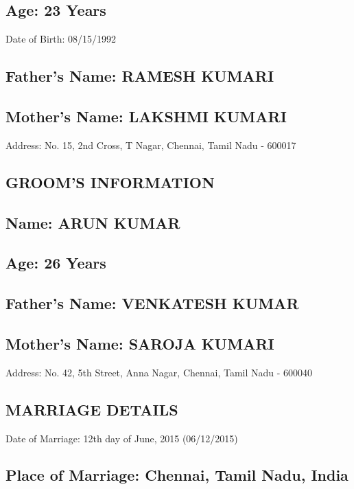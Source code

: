 \subsection*{Age: 23 Years}

Date of Birth: 08/15/1992

\subsection*{Father's Name: RAMESH KUMARI}

\subsection*{Mother's Name: LAKSHMI KUMARI}

Address: No. 15, 2nd Cross, T Nagar, Chennai, Tamil Nadu - 600017

\subsection*{GROOM'S INFORMATION}

\subsection*{Name: ARUN KUMAR}

\subsection*{Age: 26 Years}

\subsection*{Father's Name: VENKATESH KUMAR}

\subsection*{Mother's Name: SAROJA KUMARI}

Address: No. 42, 5th Street, Anna Nagar, Chennai, Tamil Nadu - 600040

\subsection*{MARRIAGE DETAILS}

Date of Marriage: 12th day of June, 2015 (06/12/2015)

\subsection*{Place of Marriage: Chennai, Tamil Nadu, India}

